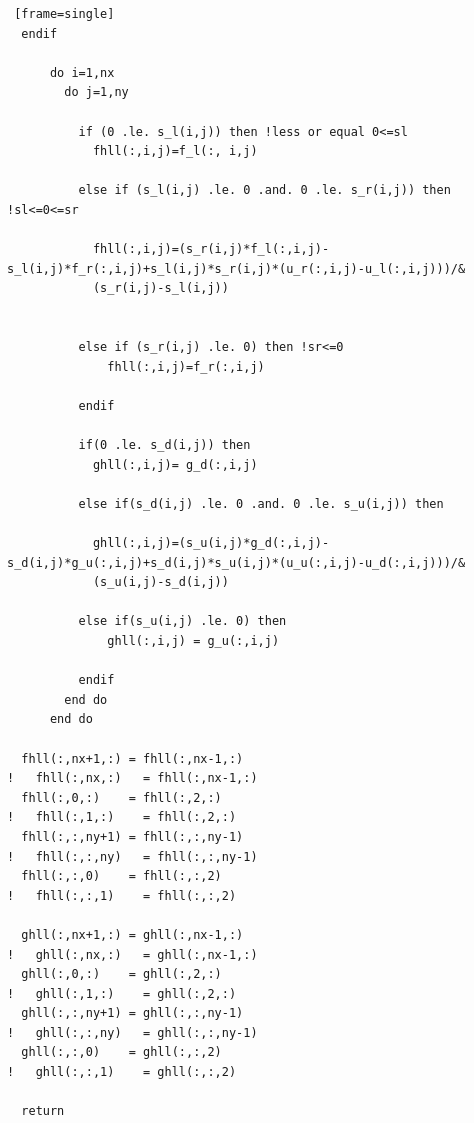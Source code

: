 \documentclass[12pt,a4paper]{book}
\begin{document}
\begin{lstlisting} [frame=single]
  endif

      do i=1,nx
        do j=1,ny
          
          if (0 .le. s_l(i,j)) then !less or equal 0<=sl
            fhll(:,i,j)=f_l(:, i,j)

          else if (s_l(i,j) .le. 0 .and. 0 .le. s_r(i,j)) then !sl<=0<=sr
        
            fhll(:,i,j)=(s_r(i,j)*f_l(:,i,j)-s_l(i,j)*f_r(:,i,j)+s_l(i,j)*s_r(i,j)*(u_r(:,i,j)-u_l(:,i,j)))/&
            (s_r(i,j)-s_l(i,j))

      
          else if (s_r(i,j) .le. 0) then !sr<=0
              fhll(:,i,j)=f_r(:,i,j)

          endif

          if(0 .le. s_d(i,j)) then
            ghll(:,i,j)= g_d(:,i,j)

          else if(s_d(i,j) .le. 0 .and. 0 .le. s_u(i,j)) then

            ghll(:,i,j)=(s_u(i,j)*g_d(:,i,j)-s_d(i,j)*g_u(:,i,j)+s_d(i,j)*s_u(i,j)*(u_u(:,i,j)-u_d(:,i,j)))/&
            (s_u(i,j)-s_d(i,j))

          else if(s_u(i,j) .le. 0) then
              ghll(:,i,j) = g_u(:,i,j)

          endif
        end do
      end do

  fhll(:,nx+1,:) = fhll(:,nx-1,:)
!   fhll(:,nx,:)   = fhll(:,nx-1,:)     
  fhll(:,0,:)    = fhll(:,2,:)
!   fhll(:,1,:)    = fhll(:,2,:)     
  fhll(:,:,ny+1) = fhll(:,:,ny-1)
!   fhll(:,:,ny)   = fhll(:,:,ny-1)
  fhll(:,:,0)    = fhll(:,:,2)
!   fhll(:,:,1)    = fhll(:,:,2)

  ghll(:,nx+1,:) = ghll(:,nx-1,:)
!   ghll(:,nx,:)   = ghll(:,nx-1,:)     
  ghll(:,0,:)    = ghll(:,2,:)
!   ghll(:,1,:)    = ghll(:,2,:)     
  ghll(:,:,ny+1) = ghll(:,:,ny-1)
!   ghll(:,:,ny)   = ghll(:,:,ny-1)
  ghll(:,:,0)    = ghll(:,:,2)
!   ghll(:,:,1)    = ghll(:,:,2)

  return


\end{lstlisting}
\end{document}
